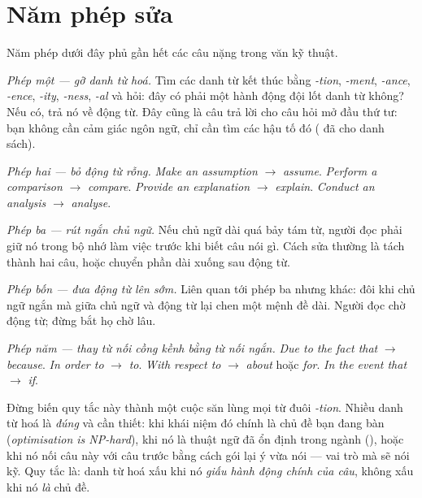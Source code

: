 \documentclass[../../english.tex]{subfiles}
\begin{document}
\section{Năm phép sửa}

Năm phép dưới đây phủ gần hết các câu nặng trong văn kỹ thuật.

\emph{Phép một --- gỡ danh từ hoá.} Tìm các danh từ kết thúc bằng \emph{-tion}, \emph{-ment}, \emph{-ance}, \emph{-ence}, \emph{-ity}, \emph{-ness}, \emph{-al} và hỏi: đây có phải một hành động đội lốt danh từ không? Nếu có, trả nó về động từ. Đây cũng là câu trả lời cho câu hỏi mở đầu thứ tư: bạn không cần cảm giác ngôn ngữ, chỉ cần tìm các hậu tố đó ( đã cho danh sách).

\emph{Phép hai --- bỏ động từ rỗng.} \emph{Make an assumption} \(\rightarrow\) \emph{assume}. \emph{Perform a comparison} \(\rightarrow\) \emph{compare}. \emph{Provide an explanation} \(\rightarrow\) \emph{explain}. \emph{Conduct an analysis} \(\rightarrow\) \emph{analyse}.

\emph{Phép ba --- rút ngắn chủ ngữ.} Nếu chủ ngữ dài quá bảy tám từ, người đọc phải giữ nó trong bộ nhớ làm việc trước khi biết câu nói gì. Cách sửa thường là tách thành hai câu, hoặc chuyển phần dài xuống sau động từ.

\emph{Phép bốn --- đưa động từ lên sớm.} Liên quan tới phép ba nhưng khác: đôi khi chủ ngữ ngắn mà giữa chủ ngữ và động từ lại chen một mệnh đề dài. Người đọc chờ động từ; đừng bắt họ chờ lâu.

\emph{Phép năm --- thay từ nối cồng kềnh bằng từ nối ngắn.} \emph{Due to the fact that} \(\rightarrow\) \emph{because}. \emph{In order to} \(\rightarrow\) \emph{to}. \emph{With respect to} \(\rightarrow\) \emph{about} hoặc \emph{for}. \emph{In the event that} \(\rightarrow\) \emph{if}.

\begin{mauau}
\end{mauau}

\begin{cambay}
Đừng biến quy tắc này thành một cuộc săn lùng mọi từ đuôi \emph{-tion}. Nhiều danh từ hoá là \emph{đúng} và cần thiết: khi khái niệm đó chính là chủ đề bạn đang bàn (\emph{optimisation is NP-hard}), khi nó là thuật ngữ đã ổn định trong ngành (), hoặc khi nó nối câu này với câu trước bằng cách gói lại ý vừa nói --- vai trò mà  sẽ nói kỹ. Quy tắc là: danh từ hoá xấu khi nó \emph{giấu hành động chính của câu}, không xấu khi nó \emph{là} chủ đề.
\end{cambay}
\end{document}
